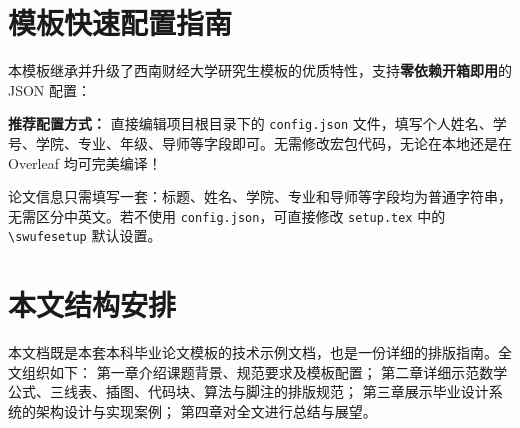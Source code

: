 \section{模板快速配置指南}

本模板继承并升级了西南财经大学研究生模板的优质特性，支持\textbf{零依赖开箱即用}的 JSON 配置：

\begin{promptbox}
\textbf{推荐配置方式：} 直接编辑项目根目录下的 \texttt{config.json} 文件，填写个人姓名、学号、学院、专业、年级、导师等字段即可。无需修改宏包代码，无论在本地还是在 Overleaf 均可完美编译！
\end{promptbox}

论文信息只需填写一套：标题、姓名、学院、专业和导师等字段均为普通字符串，无需区分中英文。若不使用 \texttt{config.json}，可直接修改 \texttt{setup.tex} 中的 \texttt{\textbackslash swufesetup} 默认设置。

\section{本文结构安排}

本文档既是本套本科毕业论文模板的技术示例文档，也是一份详细的排版指南。全文组织如下：
第一章介绍课题背景、规范要求及模板配置；
第二章详细示范数学公式、三线表、插图、代码块、算法与脚注的排版规范；
第三章展示毕业设计系统的架构设计与实现案例；
第四章对全文进行总结与展望。
